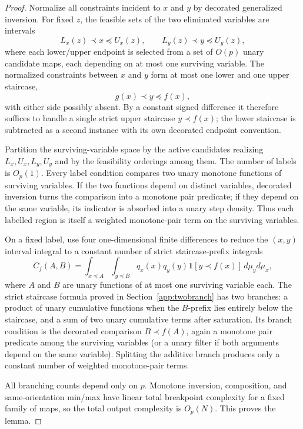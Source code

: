 \documentclass[12pt,a4paper]{article}
\theoremstyle{definition}
\newcommand{\1}{\mathbf 1}
\begin{document}
\begin{proof}
Normalize all constraints incident to $x$ and $y$ by decorated generalized inversion.  For fixed $z$, the feasible sets of the two eliminated variables are intervals
\[
L_x(z)\prec x\preceq U_x(z),\qquad L_y(z)\prec y\preceq U_y(z),
\]
where each lower/upper endpoint is selected from a set of $O(p)$ unary candidate maps, each depending on at most one surviving variable.  The normalized constraints between $x$ and $y$ form at most one lower and one upper staircase,
\[
g(x)\prec y\preceq f(x),
\]
with either side possibly absent.  By a constant signed difference it therefore suffices to handle a single strict upper staircase $y\prec f(x)$; the lower staircase is subtracted as a second instance with its own decorated endpoint convention.

Partition the surviving-variable space by the active candidates realizing $L_x,U_x,L_y,U_y$ and by the feasibility orderings among them.  The number of labels is $O_p(1)$.  Every label condition compares two unary monotone functions of surviving variables.  If the two functions depend on distinct variables, decorated inversion turns the comparison into a monotone pair predicate; if they depend on the same variable, its indicator is absorbed into a unary step density.  Thus each labelled region is itself a weighted monotone-pair term on the surviving variables.

On a fixed label, use four one-dimensional finite differences to reduce the $(x,y)$ interval integral to a constant number of strict staircase-prefix integrals
\[
C_f(A,B)=\int_{x\preceq A}\int_{y\preceq B} q_x(x)q_y(y)\mathbf1[y\prec f(x)]\,d\mu_y d\mu_x,
\]
where $A$ and $B$ are unary functions of at most one surviving variable each.  The strict staircase formula proved in Section~\ref{app:twobranch} has two branches: a product of unary cumulative functions when the $B$-prefix lies entirely below the staircase, and a sum of two unary cumulative terms after saturation.  Its branch condition is the decorated comparison $B\prec f(A)$, again a monotone pair predicate among the surviving variables (or a unary filter if both arguments depend on the same variable).  Splitting the additive branch produces only a constant number of weighted monotone-pair terms.

All branching counts depend only on $p$.  Monotone inversion, composition, and same-orientation min/max have linear total breakpoint complexity for a fixed family of maps, so the total output complexity is $O_p(N)$.  This proves the lemma.
\end{proof}
\end{document}
